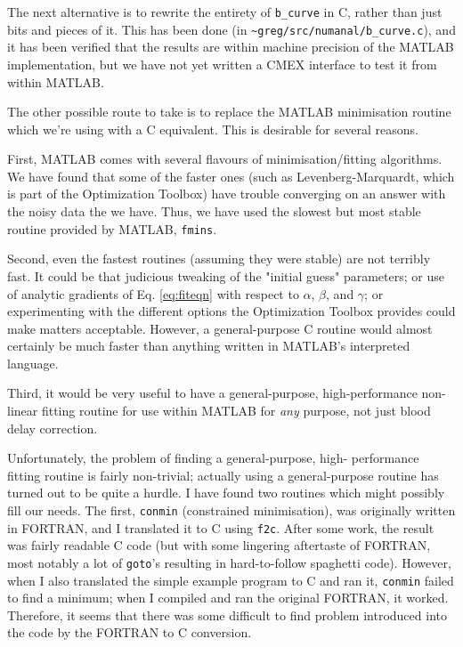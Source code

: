 \documentclass[12pt]{article}
\begin{document}
The next alternative is to rewrite the entirety of \verb|b_curve| in
C, rather than just bits and pieces of it.  This has been done (in
\verb|~greg/src/numanal/b_curve.c|), and it has been verified that the
results are within machine precision of the MATLAB implementation, but
we have not yet written a CMEX interface to test it from within MATLAB.

The other possible route to take is to replace the MATLAB minimisation
routine which we're using with a C equivalent.  This is desirable for
several reasons.

First, MATLAB comes with several flavours of minimisation/fitting
algorithms.  We have found that some of the faster ones (such as
Levenberg-Marquardt, which is part of the Optimization Toolbox) have
trouble converging on an answer with the noisy data the we have.
Thus, we have used the slowest but most stable routine provided by
MATLAB, \verb|fmins|.

Second, even the fastest routines (assuming they were stable) are not
terribly fast.  It could be that judicious tweaking of the "initial
guess" parameters; or use of analytic gradients of Eq. \ref{eq:fiteqn}
with respect to $\alpha$, $\beta$, and $\gamma$; or experimenting with
the different options the Optimization Toolbox provides could make
matters acceptable.  However, a general-purpose C routine would almost
certainly be much faster than anything written in MATLAB's interpreted
language.

Third, it would be very useful to have a general-purpose,
high-performance non-linear fitting routine for use within MATLAB for
{\em any} purpose, not just blood delay correction.

Unfortunately, the problem of finding a general-purpose, high-
performance fitting routine is fairly non-trivial; actually using a
general-purpose routine has turned out to be quite a hurdle.  I have
found two routines which might possibly fill our needs.  The first,
\verb|conmin| (constrained minimisation), was originally written in
FORTRAN, and I translated it to C using \verb|f2c|.  After some work,
the result was fairly readable C code (but with some lingering
aftertaste of FORTRAN, most notably a lot of \verb|goto|'s resulting
in hard-to-follow spaghetti code).  However, when I also translated
the simple example program to C and ran it, \verb|conmin| failed to
find a minimum; when I compiled and ran the original FORTRAN, it
worked.  Therefore, it seems that there was some difficult to find
problem introduced into the code by the FORTRAN to C conversion.
\end{document}
